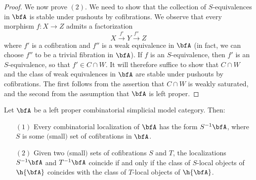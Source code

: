 \begin{proof}
We now prove $(2)$. We need to show that the collection of $S$-equivalences in $\bfA$ is stable under pushouts by cofibrations. We observe that every morphism $f: X \rightarrow Z$ admits a factorization 
$$ X \stackrel{f'}{\rightarrow} Y \stackrel{f''}{\rightarrow} Z$$
where $f'$ is a cofibration and $f''$ is a weak equivalence in $\bfA$ (in fact, we can choose $f''$ to be a trivial fibration in $\bfA$). If $f$ is an $S$-equivalence, then $f'$ is an $S$-equivalence, so that $f' \in C \cap W$. It will therefore suffice to show that $C \cap W$ and the class of weak equivalences in $\bfA$ are stable under pushouts by cofibrations. The first follows from the assertion that $C \cap W$ is weakly saturated, and the second from the assumption that $\bfA$ is left proper.
\end{proof}

\begin{proposition}\label{surito}
Let $\bfA$ be a left proper combinatorial simplicial model category. Then:
\begin{itemize}
\item[$(1)$] Every combinatorial localization of $\bfA$ has the form $S^{-1} \bfA$, where
$S$ is some $($small$)$ set of cofibrations in $\bfA$.
\item[$(2)$] Given two $($small$)$ sets of cofibrations $S$ and $T$, the localizations
$S^{-1} \bfA$ and $T^{-1} \bfA$ coincide if and only if the class of $S$-local objects of
$\h{\bfA}$ coincides with the class of $T$-local objects of $\h{\bfA}$.
\end{itemize}
\end{proposition}

